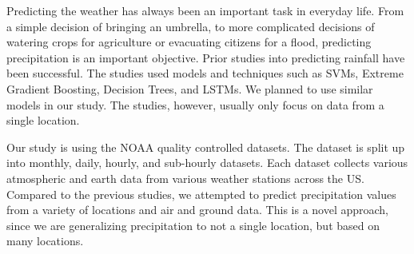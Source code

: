 \documentclass[../report.tex]{subfiles}
\begin{document}
Predicting the weather has always been an important task in everyday life.
From a simple decision of bringing an umbrella, to more complicated decisions of watering crops for agriculture or evacuating citizens for a flood, predicting precipitation is an important objective.
Prior studies into predicting rainfall have been successful.
The studies used models and techniques such as SVMs, Extreme Gradient Boosting, Decision Trees, and LSTMs. \cite*{liyew_machine_2021,barrera-animas_rainfall_2022,rahman_rainfall_2022}
We planned to use similar models in our study.
The studies, however, usually only focus on data from a single location.

Our study is using the NOAA quality controlled datasets. \cite*{diamond_us_2013}
The dataset is split up into monthly, daily, hourly, and sub-hourly datasets.
Each dataset collects various atmospheric and earth data from various weather stations across the US.
Compared to the previous studies, we attempted to predict precipitation values from a variety of locations and air and ground data.
This is a novel approach, since we are generalizing precipitation to not a single location, but based on many locations.
\end{document}
